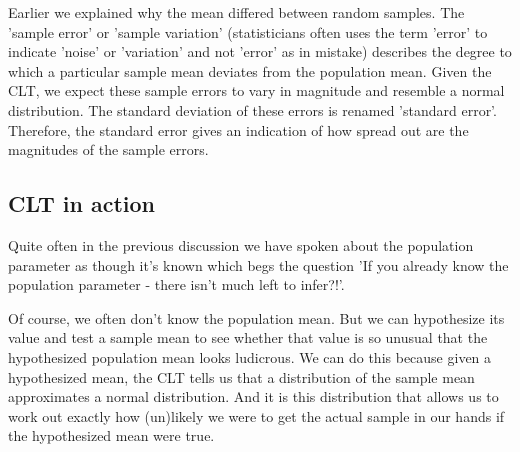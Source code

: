 \documentclass[a4paper,twosided,notoc]{tufte-book}
\begin{document}
Earlier we explained why the mean differed between random samples. The 'sample error' or 'sample variation' (statisticians often uses the term 'error' to indicate 'noise' or 'variation' and not 'error' as in mistake) describes the degree to which a particular sample mean deviates from the population mean. Given the CLT, we expect these sample errors to vary in magnitude and resemble a normal distribution. The standard deviation of these errors is renamed 'standard error'. Therefore, the standard error gives an indication of how spread out are the magnitudes of the sample errors.

\subsection{CLT in action}
Quite often in the previous discussion we have spoken about the population parameter as though it's known which begs the question 'If you already know the population parameter - there isn't much left to infer?!'. 

Of course, we often don't know the population mean. But we can hypothesize its value and test a sample mean to see whether that value is so unusual that the hypothesized population mean looks ludicrous. We can do this because given a hypothesized mean, the CLT tells us that a distribution of the sample mean approximates a normal distribution. And it is this distribution that allows us to work out exactly how (un)likely we were to get the actual sample in our hands if the hypothesized mean were true. 
\end{document}
